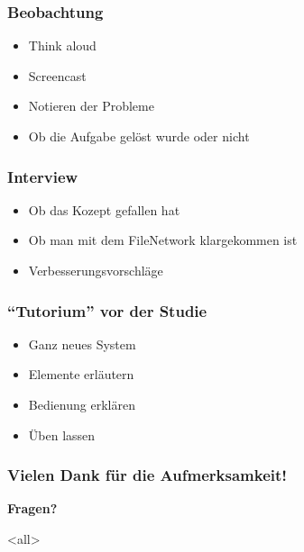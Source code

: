 \begin{frame}

\frametitle{Beobachtung}
\label{beobachtung}

\begin{itemize}
\item Think aloud

\item Screencast

\item Notieren der Probleme

\item Ob die Aufgabe gelöst wurde oder nicht

\end{itemize}

\end{frame}

\begin{frame}

\frametitle{Interview}
\label{interview}

\begin{itemize}
\item Ob das Kozept gefallen hat

\item Ob man mit dem FileNetwork klargekommen ist

\item Verbesserungsvorschläge

\end{itemize}

\end{frame}

\begin{frame}

\frametitle{``Tutorium'' vor der Studie}
\label{tutoriumvorderstudie}

\begin{itemize}
\item Ganz neues System

\item Elemente erläutern

\item Bedienung erklären

\item Üben lassen

\end{itemize}

\end{frame}

\begin{frame}

\frametitle{Vielen Dank für die Aufmerksamkeit!}
\label{vielendankfrdieaufmerksamkeit}

\textbf{Fragen?}

\end{frame}

\mode<all>


\mode*

